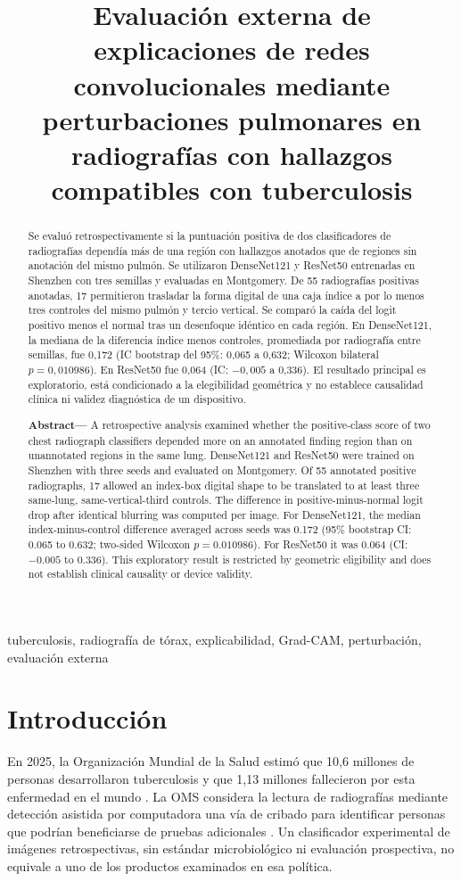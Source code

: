 \documentclass[conference]{IEEEtran}
\title{Evaluación externa de explicaciones de redes convolucionales mediante perturbaciones pulmonares en radiografías con hallazgos compatibles con tuberculosis}
\author{\IEEEauthorblockN{Alexandra Cristal Salazar Gisberth}
\IEEEauthorblockA{Carrera de Informática, Facultad de Ciencias Puras y Naturales\\Universidad Mayor de San Andrés, La Paz, Bolivia}}
\begin{document}
\maketitle
\begin{abstract}
Se evaluó retrospectivamente si la puntuación positiva de dos clasificadores de radiografías dependía más de una región con hallazgos anotados que de regiones sin anotación del mismo pulmón. Se utilizaron DenseNet121 y ResNet50 entrenadas en Shenzhen con tres semillas y evaluadas en Montgomery. De 55 radiografías positivas anotadas, 17 permitieron trasladar la forma digital de una caja índice a por lo menos tres controles del mismo pulmón y tercio vertical. Se comparó la caída del logit positivo menos el normal tras un desenfoque idéntico en cada región. En DenseNet121, la mediana de la diferencia índice menos controles, promediada por radiografía entre semillas, fue 0,172 (IC bootstrap del 95\%: 0,065 a 0,632; Wilcoxon bilateral $p=0,010986$). En ResNet50 fue 0,064 (IC: $-0,005$ a 0,336). El resultado principal es exploratorio, está condicionado a la elegibilidad geométrica y no establece causalidad clínica ni validez diagnóstica de un dispositivo.
\end{abstract}
\begin{IEEEkeywords}
tuberculosis, radiografía de tórax, explicabilidad, Grad-CAM, perturbación, evaluación externa
\end{IEEEkeywords}
\begin{abstract}
\textbf{Abstract---} A retrospective analysis examined whether the positive-class score of two chest radiograph classifiers depended more on an annotated finding region than on unannotated regions in the same lung. DenseNet121 and ResNet50 were trained on Shenzhen with three seeds and evaluated on Montgomery. Of 55 annotated positive radiographs, 17 allowed an index-box digital shape to be translated to at least three same-lung, same-vertical-third controls. The difference in positive-minus-normal logit drop after identical blurring was computed per image. For DenseNet121, the median index-minus-control difference averaged across seeds was 0.172 (95\% bootstrap CI: 0.065 to 0.632; two-sided Wilcoxon $p=0.010986$). For ResNet50 it was 0.064 (CI: $-0.005$ to 0.336). This exploratory result is restricted by geometric eligibility and does not establish clinical causality or device validity.
\end{abstract}

\section{Introducción}
En 2025, la Organización Mundial de la Salud estimó que 10,6 millones de personas desarrollaron tuberculosis y que 1,13 millones fallecieron por esta enfermedad en el mundo \cite{who2026}. La OMS considera la lectura de radiografías mediante detección asistida por computadora una vía de cribado para identificar personas que podrían beneficiarse de pruebas adicionales \cite{whocad2025}. Un clasificador experimental de imágenes retrospectivas, sin estándar microbiológico ni evaluación prospectiva, no equivale a uno de los productos examinados en esa política.
\end{document}
